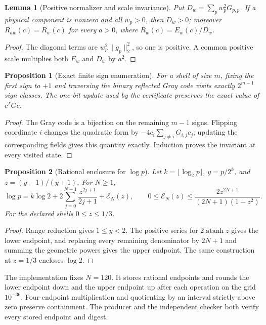 \documentclass[10pt,a4paper]{article}
\newtheorem{proposition}{Proposition}
\newtheorem{lemma}{Lemma}
\begin{document}
\begin{lemma}[Positive normalizer and scale invariance]
Put $D_w=\sum_p w_p^2G_{p,p}$.  If a physical component is nonzero and all
$w_p>0$, then $D_w>0$; moreover $R_{aw}(c)=R_w(c)$ for every $a>0$, where
$R_w(c)=E_w(c)/D_w$.
\end{lemma}
\begin{proof}
The diagonal terms are $w_p^2\|g_p\|_2^2$, so one is positive.  A common
positive scale multiplies both $E_w$ and $D_w$ by $a^2$.
\end{proof}

\begin{proposition}[Exact finite sign enumeration]
For a shell of size $m$, fixing the first sign to $+1$ and traversing the
binary reflected Gray code visits exactly $2^{m-1}$ sign classes.  The
one-bit update used by the certificate preserves the exact value of
$c^TGc$.
\end{proposition}
\begin{proof}
The Gray code is a bijection on the remaining $m-1$ signs.  Flipping
coordinate $i$ changes the quadratic form by
$-4c_i\sum_{j\ne i}G_{i,j}c_j$; updating the corresponding fields gives this
quantity exactly.  Induction proves the invariant at every visited state.
\end{proof}

\begin{proposition}[Rational enclosure for $\log p$]
Let $k=\lfloor\log_2p\rfloor$, $y=p/2^k$, and
$z=(y-1)/(y+1)$.  For $N\geq1$,
\begin{equation}
 \log p=k\log2+2\sum_{j=0}^{N-1}\frac{z^{2j+1}}{2j+1}+\mathcal E_N(z),
 \qquad
 0\leq\mathcal E_N(z)\leq
 \frac{2z^{2N+1}}{(2N+1)(1-z^2)} .
 \label{eq:log}
\end{equation}
For the declared shells $0\leq z\leq1/3$.
\end{proposition}
\begin{proof}
Range reduction gives $1\leq y<2$.  The positive series for
$2\operatorname{atanh}z$ gives the lower endpoint, and replacing every
remaining denominator by $2N+1$ and summing the geometric powers gives the
upper endpoint.  The same construction at $z=1/3$ encloses $\log2$.
\end{proof}

The implementation fixes $N=120$.  It stores rational endpoints and rounds
the lower endpoint down and the upper endpoint up after each operation on the
grid $10^{-36}$.  Four-endpoint multiplication and quotienting by an interval
strictly above zero preserve containment.  The producer and the independent
checker both verify every stored endpoint and digest.
\end{document}
